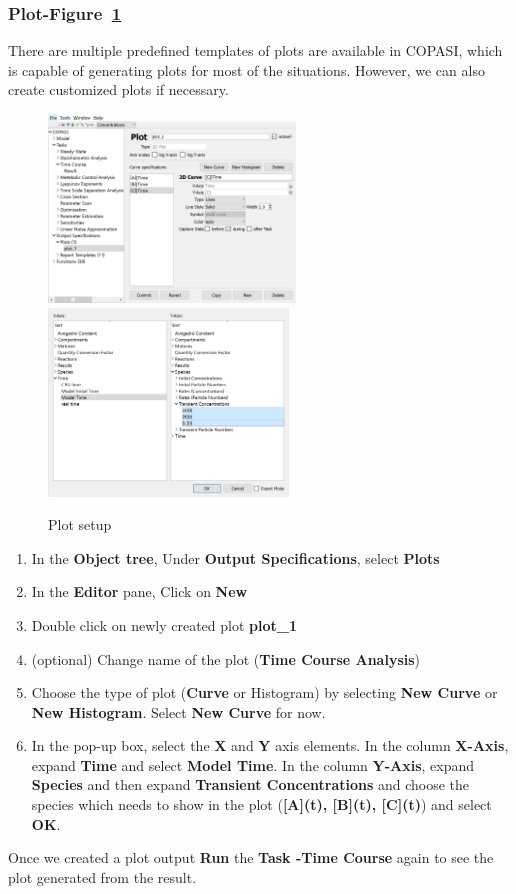 \documentclass[10pt]{article}
\theoremstyle{definition}
\theoremstyle{remark}
\begin{document}
	\subsubsection{Plot-Figure~\ref{8png}}
	There are multiple predefined templates of plots are available in COPASI, which is capable of generating plots for most of the situations. However, we can also create customized plots if necessary.
	\begin{figure}[!htb]
		\centering
		\includegraphics[height=5cm]{Images/8a.png}
		\includegraphics[height=5cm]{Images/8b.png}
		\caption{Plot setup}
		\label{8png}
	\end{figure}
	\begin{enumerate}[start=1]\def\makelabel{\textbf{Step}~}
		\item In the \textbf{Object tree}, Under \textbf{Output Specifications}, select \textbf{Plots}
		\item In the \textbf{Editor} pane, Click on \textbf{New}
		\item Double click on newly created plot \textbf{plot\_1}
		\item (optional) Change name of the plot (\textbf{Time Course Analysis})
		\item Choose the type of plot (\textbf{Curve} or Histogram) by selecting \textbf{New Curve} or \textbf{New Histogram}. Select \textbf{New Curve} for now.
		\item In the pop-up box, select the \textbf{X} and \textbf{Y} axis elements. In the column \textbf{X-Axis}, expand \textbf{Time} and select \textbf{Model Time}. In the column \textbf{Y-Axis}, expand \textbf{Species} and then expand \textbf{Transient Concentrations} and choose the species which needs to show in the plot (\textbf{[A](t), [B](t), [C](t)}) and select \textbf{OK}.\\
	\end{enumerate}
	Once we created a plot output \textbf{Run} the \textbf{Task -Time Course} again to see the plot generated from the result.
	
\end{document}
